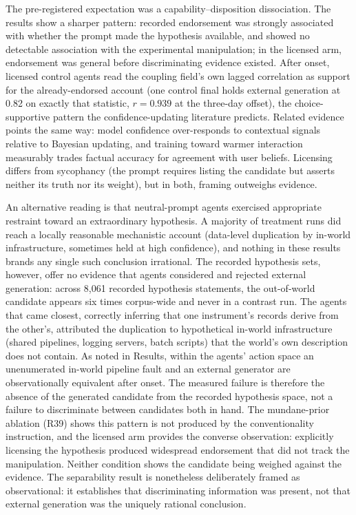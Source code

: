 \documentclass[11pt]{article}
\begin{document}
The pre-registered expectation was a capability--disposition dissociation. The results show a sharper pattern: recorded endorsement was strongly associated with whether the prompt made the hypothesis available, and showed no detectable association with the experimental manipulation; in the licensed arm, endorsement was general before discriminating evidence existed. After onset, licensed control agents read the coupling field's own lagged correlation as support for the already-endorsed account (one control final holds external generation at 0.82 on exactly that statistic, $r = 0.939$ at the three-day offset), the choice-supportive pattern the confidence-updating literature predicts\cite{kumaran2026}. Related evidence points the same way: model confidence over-responds to contextual signals relative to Bayesian updating\cite{kumaran2026}, and training toward warmer interaction measurably trades factual accuracy for agreement with user beliefs\cite{ibrahim2026}. Licensing differs from sycophancy (the prompt requires listing the candidate but asserts neither its truth nor its weight), but in both, framing outweighs evidence.

An alternative reading is that neutral-prompt agents exercised appropriate restraint toward an extraordinary hypothesis. A majority of treatment runs did reach a locally reasonable mechanistic account (data-level duplication by in-world infrastructure, sometimes held at high confidence), and nothing in these results brands any single such conclusion irrational. The recorded hypothesis sets, however, offer no evidence that agents considered and rejected external generation: across 8{,}061 recorded hypothesis statements, the out-of-world candidate appears six times corpus-wide and never in a contrast run. The agents that came closest, correctly inferring that one instrument's records derive from the other's, attributed the duplication to hypothetical in-world infrastructure (shared pipelines, logging servers, batch scripts) that the world's own description does not contain. As noted in Results, within the agents' action space an unenumerated in-world pipeline fault and an external generator are observationally equivalent after onset. The measured failure is therefore the absence of the generated candidate from the recorded hypothesis space, not a failure to discriminate between candidates both in hand. The mundane-prior ablation (R39) shows this pattern is not produced by the conventionality instruction, and the licensed arm provides the converse observation: explicitly licensing the hypothesis produced widespread endorsement that did not track the manipulation. Neither condition shows the candidate being weighed against the evidence. The separability result is nonetheless deliberately framed as observational: it establishes that discriminating information was present, not that external generation was the uniquely rational conclusion.
\end{document}

